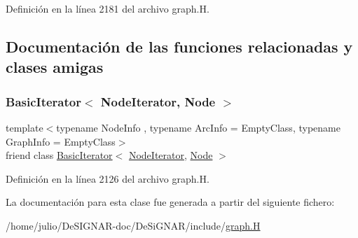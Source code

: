 Definición en la línea 2181 del archivo graph.\+H.



\subsection{Documentación de las funciones relacionadas y clases amigas}
\mbox{\label{class_designar_1_1_digraph_1_1_node_iterator_a21dc6ae614d097ff896e9e8e422d8f3c}} 
\subsubsection{\texorpdfstring{Basic\+Iterator$<$ Node\+Iterator, Node $>$}{BasicIterator< NodeIterator, Node >}}
{\footnotesize\ttfamily template$<$typename Node\+Info , typename Arc\+Info  = Empty\+Class, typename Graph\+Info  = Empty\+Class$>$ \\
friend class \hyperlink{class_designar_1_1_basic_iterator}{Basic\+Iterator}$<$ \hyperlink{class_designar_1_1_digraph_1_1_node_iterator}{Node\+Iterator}, \hyperlink{class_designar_1_1_digraph_a4dc921c41a480b7946a04170e997d8ae}{Node} $>$\hspace{0.3cm}{\ttfamily [friend]}}



Definición en la línea 2126 del archivo graph.\+H.



La documentación para esta clase fue generada a partir del siguiente fichero\+:\begin{DoxyCompactItemize}
\item 
/home/julio/\+De\+S\+I\+G\+N\+A\+R-\/doc/\+De\+Si\+G\+N\+A\+R/include/\hyperlink{graph_8_h}{graph.\+H}\end{DoxyCompactItemize}
